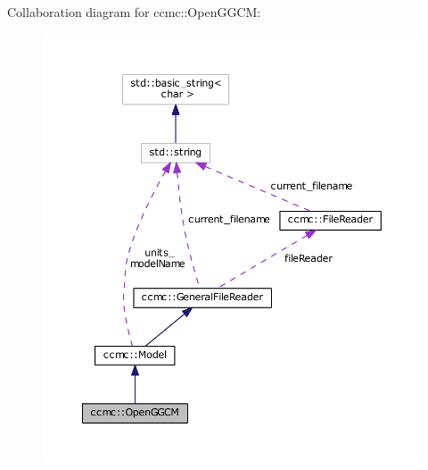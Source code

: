 Collaboration diagram for ccmc\-:\-:Open\-G\-G\-C\-M\-:
\nopagebreak
\begin{figure}[H]
\begin{center}
\leavevmode
\includegraphics[width=350pt]{classccmc_1_1_open_g_g_c_m__coll__graph}
\end{center}
\end{figure}
